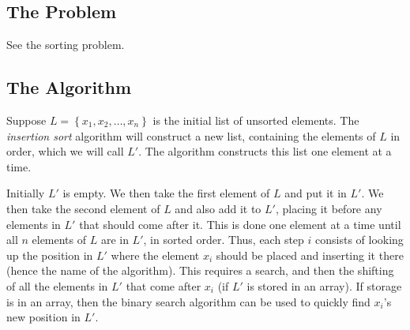 \documentclass[12pt]{article}
\newcommand{\<}{\langle}
\renewcommand{\>}{\rangle}
\begin{document}
\newcommand{\Lindent}{0.4in}
\newenvironment{Lalgorithm}[4]{
    \textbf{Algorithm} \textsc{#1}\texttt{(#2)}\newline
    \textit{Input}: #3\newline
    \textit{Output}: #4\newline

}{}
\newenvironment{Lfloatalgorithm}[6][h]{
    \begin{figure}[#1]
    \caption{#2}
    \begin{Lalgorithm}{#3}{#4}{#5}{#6}
}{
    \end{Lalgorithm}
    \end{figure}
}
\newcommand{\Lgets}{\ensuremath{\gets}}
\newcommand{\Lgroup}[1]{\textbf{begin}\\\hspace*{\Lindent}\parbox{\textwidth}{#1}\\\textbf{end}}
\newcommand{\Lif}[2]{\textbf{if} #1 \textbf{then}\\\hspace*{\Lindent}\parbox{\textwidth}{#2}} 
\newcommand{\Lelse}[1]{\textbf{else}\\\hspace*{\Lindent}\parbox{\textwidth}{#1}}
\newcommand{\Lelseif}[2]{\textbf{else if} #1 \textbf{then}\\\hspace*{\Lindent}\parbox{\textwidth}{#2}}
\newcommand{\Lfor}[2]{\textbf{for} #1 \textbf{do}\\\hspace*{\Lindent}\parbox{\textwidth}{#2}}



\subsection*{The Problem}

See the sorting problem.

\subsection*{The Algorithm}

Suppose $L = \left\{ x_1, x_2, \dots, x_n\right\}$ is the initial list of unsorted elements.
The \emph{insertion sort} algorithm will construct a new list, containing the
elements of $L$ in order, which we will call $L'$.  The algorithm constructs this list one element at a time.

Initially $L'$ is empty.  We then take the first element of $L$ and put it in $L'$.
We then take the second element of $L$ and also add it to $L'$, placing it before any elements in $L'$ that should
come after it.  This is done one element at a time until all $n$ elements of $L$ are in $L'$, in sorted order.
Thus, each step $i$ consists of looking up the position in $L'$ where the element $x_i$ should be placed
and inserting it there (hence the name of the algorithm).
This requires a search, and then the shifting of all the elements in $L'$
that come after $x_i$ (if $L'$ is stored in an array).  If storage is in an array, then the binary search algorithm
can be used to quickly find $x_i$'s new position in $L'$.
\end{document}
